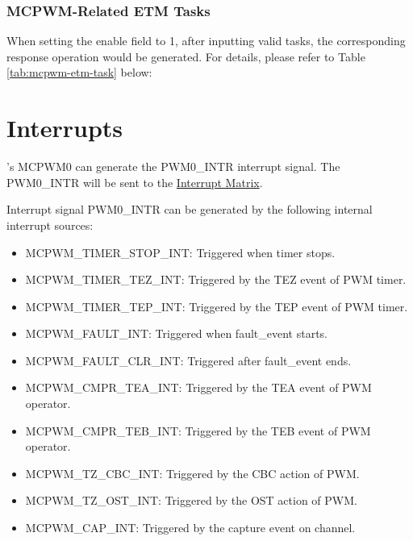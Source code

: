 \documentclass[main\_\_EN.tex]{subfiles}
\begin{document}


\subsubsection{MCPWM-Related ETM Tasks}
When setting the enable field to 1, after inputting valid tasks, the corresponding response operation would be generated. For details, please refer to Table \ref{tab:mcpwm-etm-task} below:






\section{Interrupts}
\label{sec:mcpwm-interrupts}

\chipname{}'s MCPWM0 can generate the PWM0\_INTR interrupt signal. The PWM0\_INTR will be sent to the \hyperref[mod:intmtrx]{Interrupt Matrix}.

Interrupt signal PWM0\_INTR can be generated by the following internal interrupt sources:
\begin{itemize}
\item \label{int:mcpwm-timer-stop}MCPWM\_TIMER\_STOP\_INT: Triggered when timer stops.
\item \label{int:mcpwm-timer-TEZ}MCPWM\_TIMER\_TEZ\_INT: Triggered by the TEZ event of PWM timer.
\item \label{int:mcpwm-timer-tep}MCPWM\_TIMER\_TEP\_INT: Triggered by the TEP event of PWM timer.
\item \label{int:mcpwm-fault}MCPWM\_FAULT\_INT: Triggered when fault\_event starts.
\item \label{int:mcpwm-fault-clr}MCPWM\_FAULT\_CLR\_INT: Triggered after fault\_event ends.
\item \label{int:mcpwm-cmpr-tea}MCPWM\_CMPR\_TEA\_INT: Triggered by the TEA event of PWM operator.
\item \label{int:mcpwm-cmpr-teb}MCPWM\_CMPR\_TEB\_INT: Triggered by the TEB event of PWM operator.
\item \label{int:mcpwm-tz-cbc}MCPWM\_TZ\_CBC\_INT: Triggered by the CBC action of PWM.
\item \label{int:mcpwm-tz-ost}MCPWM\_TZ\_OST\_INT: Triggered by the OST action of PWM.
\item \label{int:mcpwm-cap}MCPWM\_CAP\_INT: Triggered by the capture event on channel.
\end{itemize}
\end{document}
